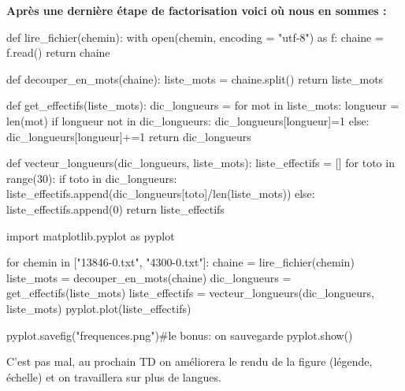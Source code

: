 \newpage
\textbf{Après une dernière étape de factorisation voici où nous en sommes :}

\begin{python}
def lire_fichier(chemin):
  with open(chemin, encoding = "utf-8") as f:
    chaine = f.read()
  return chaine

def decouper_en_mots(chaine):
  liste_mots = chaine.split()
  return liste_mots

def get_effectifs(liste_mots):
  dic_longueurs = {}
  for mot in liste_mots:
    longueur = len(mot)
    if longueur not in dic_longueurs:
      dic_longueurs[longueur]=1 
    else:
      dic_longueurs[longueur]+=1
  return dic_longueurs

def vecteur_longueurs(dic_longueurs, liste_mots):
  liste_effectifs = []
  for toto in range(30):
    if toto in dic_longueurs:
      liste_effectifs.append(dic_longueurs[toto]/len(liste_mots))
    else:
      liste_effectifs.append(0)
  return liste_effectifs

import matplotlib.pyplot as pyplot

for chemin in ["13846-0.txt", "4300-0.txt"]:
  chaine = lire_fichier(chemin)
  liste_mots = decouper_en_mots(chaine)
  dic_longueurs = get_effectifs(liste_mots)
  liste_effectifs = vecteur_longueurs(dic_longueurs, liste_mots)
  pyplot.plot(liste_effectifs)

pyplot.savefig("frequences.png")#le bonus: on sauvegarde
pyplot.show()


\end{python}

C'est pas mal, au prochain TD on améliorera le rendu de la figure (légende, échelle) et on travaillera sur plus de langues.
